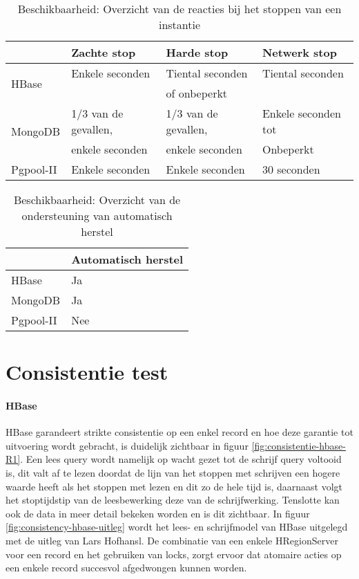 \begin{table}[htbp]
  \centering
    \begin{tabular}{l | lll}
          & Zachte stop & Harde stop & Netwerk stop \\
    \hline
    \multirow{2}{*}{HBase} & Enkele seconden & Tiental seconden & Tiental seconden \\
    & & of onbeperkt&  \\
    \multirow{2}{*}{MongoDB} & 1/3 van de gevallen, & 1/3 van de gevallen, & Enkele seconden tot \\
    & enkele seconden & enkele seconden & Onbeperkt\\
    Pgpool-II & Enkele seconden & Enkele seconden & 30 seconden \\
    \end{tabular}%
    \caption{Beschikbaarheid: Overzicht van de reacties bij het stoppen van een instantie }
  \label{table:beschikbaarheid-stop-resultaat}%
\end{table}

\begin{table}[htbp]
  \centering
    \begin{tabular}{l|l}
          & Automatisch herstel \\
    \hline
    HBase & Ja \\
    MongoDB & Ja \\
    Pgpool-II & Nee \\
    \end{tabular}%
      \caption{Beschikbaarheid: Overzicht van de ondersteuning van automatisch herstel}
  \label{table:beschikbaarheid-herstel-resultaat}%
\end{table}%



\section{Consistentie test}
\paragraph{HBase} HBase garandeert strikte consistentie op een enkel record en hoe deze garantie tot uitvoering wordt gebracht, is duidelijk zichtbaar in figuur \ref{fig:consistentie-hbase-R1}. Een lees query wordt namelijk op wacht gezet tot de schrijf query voltooid is, dit valt af te lezen doordat de lijn van het stoppen met schrijven een hogere waarde heeft als het stoppen met lezen en dit zo de hele tijd is, daarnaast volgt het stoptijdstip van de leesbewerking deze van de schrijfwerking. Tenslotte kan ook de data in meer detail bekeken worden en is dit zichtbaar. In figuur \ref{fig:consistency-hbase-uitleg} wordt het lees- en schrijfmodel van HBase uitgelegd met de uitleg van Lars Hofhansl\cite{hbase-acid}. De combinatie van een enkele HRegionServer voor een record en het gebruiken van locks, zorgt ervoor dat atomaire acties op een enkele record succesvol afgedwongen kunnen worden.     

